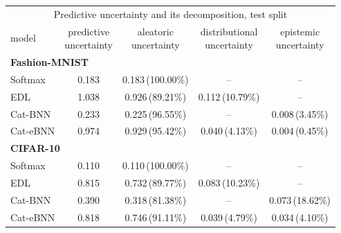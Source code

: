 \begin{tabular}{lcccc}
\toprule
\multicolumn{5}{c}{Predictive uncertainty and its decomposition, test split} \\
model & \shortstack{predictive\\uncertainty} & \shortstack{aleatoric\\uncertainty} & \shortstack{distributional\\uncertainty} & \shortstack{epistemic\\uncertainty} \\
\midrule
\multicolumn{5}{l}{\textbf{Fashion-MNIST}} \\
\midrule
Softmax & 0.183 & 0.183\,(100.00\%) & -- & -- \\
EDL & 1.038 & 0.926\,(89.21\%) & 0.112\,(10.79\%) & -- \\
Cat-BNN & 0.233 & 0.225\,(96.55\%) & -- & 0.008\,(3.45\%) \\
Cat-eBNN & 0.974 & 0.929\,(95.42\%) & 0.040\,(4.13\%) & 0.004\,(0.45\%) \\
\midrule
\multicolumn{5}{l}{\textbf{CIFAR-10}} \\
\midrule
Softmax & 0.110 & 0.110\,(100.00\%) & -- & -- \\
EDL & 0.815 & 0.732\,(89.77\%) & 0.083\,(10.23\%) & -- \\
Cat-BNN & 0.390 & 0.318\,(81.38\%) & -- & 0.073\,(18.62\%) \\
Cat-eBNN & 0.818 & 0.746\,(91.11\%) & 0.039\,(4.79\%) & 0.034\,(4.10\%) \\
\bottomrule
\end{tabular}
